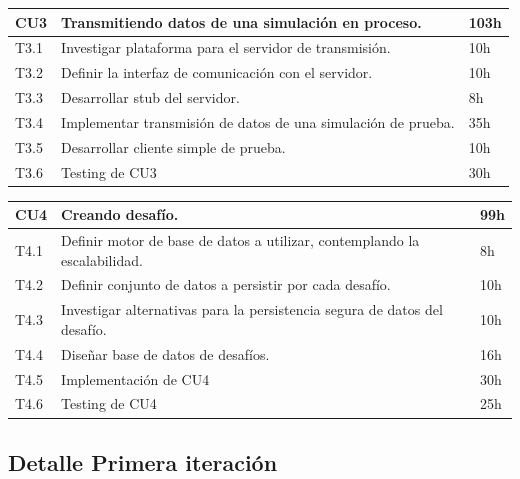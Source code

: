 \documentclass[a4paper, 10pt, twoside]{article}
\begin{document}
\vspace{1em}

\begin{tabular}{lp{13cm}l}
  \hline
  CU3 & Transmitiendo datos de una simulación en proceso. & 103h \\
  \hline
  T3.1 & Investigar plataforma para el servidor de transmisión. & 10h \\
  T3.2 & Definir la interfaz de comunicación con el servidor. & 10h \\
  T3.3 & Desarrollar stub del servidor. & 8h \\
  T3.4 & Implementar transmisión de datos de una simulación de prueba. & 35h \\
  T3.5 & Desarrollar cliente simple de prueba. & 10h \\
  T3.6 & Testing de CU3 & 30h\\
  \hline
\end{tabular}

\vspace{1em}

\begin{tabular}{lp{13cm}l}
  \hline
  CU4 & Creando desafío. & 99h \\
  \hline
  T4.1 & Definir motor de base de datos a utilizar, contemplando la escalabilidad. & 8h \\
  T4.2 & Definir conjunto de datos a persistir por cada desafío. & 10h \\
  T4.3 & Investigar alternativas para la persistencia segura de datos del desafío. & 10h \\
  T4.4 & Diseñar base de datos de desafíos. & 16h \\
  T4.5 & Implementación de CU4 & 30h\\
  T4.6 & Testing de CU4 & 25h\\
  \hline
\end{tabular}


\subsection{Detalle Primera iteración}
\end{document}
